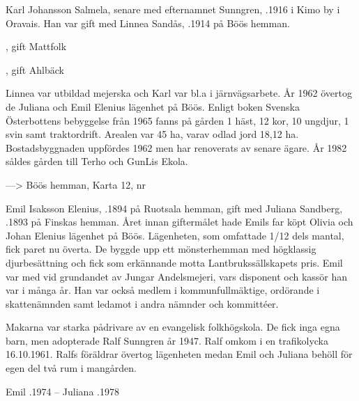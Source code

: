 Karl Johansson Salmela, senare med efternamnet Sunngren, .1916 i Kimo by i Oravais. Han var gift med Linnea Sandås, .1914 på Böös hemman.
\begin{jhchildren}
  \item {}
  \item {}
  \item {}, gift Mattfolk
  \item {}, gift Ahlbäck
  \item {}
  \item {}
\end{jhchildren}
Linnea var utbildad mejerska och Karl var bl.a i järnvägsarbete. År 1962 övertog de Juliana och Emil Elenius lägenhet på Böös. Enligt boken Svenska Österbottens bebyggelse från 1965 fanns på gården 1 häst, 12 kor, 10 ungdjur, 1 svin samt traktordrift. Arealen var 45 ha, varav odlad jord 18,12 ha. Bostadsbyggnaden uppfördes 1962 men har renoverats av senare ägare. År 1982 såldes gården till Terho och GunLis Ekola.



---> 	Böös hemman, Karta 12, nr 

Emil Isaksson Elenius, .1894 på Ruotsala hemman, gift med Juliana Sandberg, .1893 på Finskas hemman. Året innan giftermålet hade Emils far köpt Olivia och Johan Elenius lägenhet på Böös. Lägenheten, som omfattade 1/12 dels mantal, fick	paret nu överta. De byggde upp ett mönsterhemman med högklassig djurbesättning och fick som erkännande motta Lantbrukssällskapets pris. Emil var med vid grundandet av Jungar Andelsmejeri, vars disponent och kassör han var i många år. Han var också medlem i kommunfullmäktige, ordörande i skattenämnden samt ledamot i andra nämnder och kommittéer.

Makarna var starka pådrivare av en evangelisk folkhögskola. De fick inga egna barn, men adopterade Ralf Sunngren år 1947. Ralf omkom i en trafikolycka 16.10.1961. Ralfs föräldrar övertog lägenheten medan Emil och Juliana behöll för egen del två rum i mangården.

Emil .1974  --  Juliana .1978


